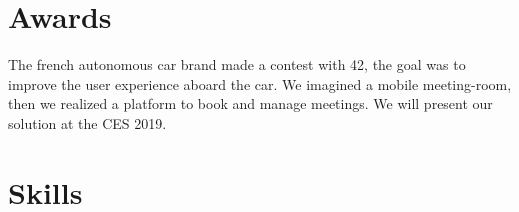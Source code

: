 \documentclass[a4paper]{deedy-resume} %
\begin{document}
\sectionspace %


\section{Awards}




\sectionspace %


\begin{description}[leftmargin=0pt]
\item The french autonomous car brand made a contest with 42, the goal was to improve the user experience aboard the car. We imagined a mobile meeting-room, then we realized a platform to book and manage meetings. We will present our solution at the CES 2019.
\end{description}
\sectionspace %

\sectionspace %


\section{Skills}
\end{document}
